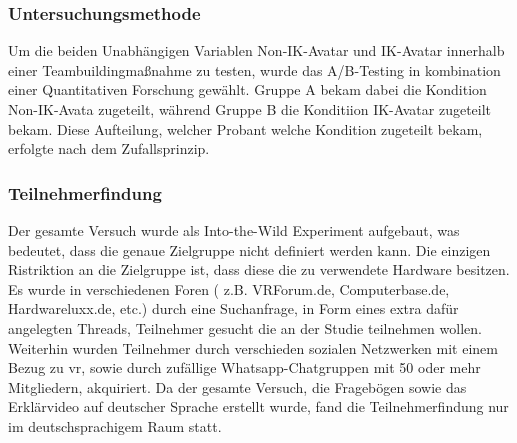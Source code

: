 \documentclass[a4paper,11pt]{article}%
\renewcommand{\\}{\vspace*{0.5\baselineskip} \newline}
\begin{document}
\subsubsection{Untersuchungsmethode}
Um die beiden Unabhängigen Variablen \dq{}Non-IK-Avatar\dq{} und \dq{}IK-Avatar\dq{} innerhalb einer Teambuildingmaßnahme zu testen, wurde das A/B-Testing in kombination einer Quantitativen Forschung gewählt.
Gruppe A bekam dabei die Kondition \dq{}Non-IK-Avata\dq{} zugeteilt, während Gruppe B die Konditiion \dq{}IK-Avatar\dq{} zugeteilt bekam. Diese Aufteilung, welcher Probant welche Kondition zugeteilt bekam, erfolgte nach dem Zufallsprinzip. 

	\subsubsection{Teilnehmerfindung}
Der gesamte Versuch wurde als Into-the-Wild Experiment aufgebaut, was bedeutet, dass die genaue Zielgruppe nicht definiert werden kann. Die einzigen Ristriktion an die Zielgruppe ist, dass diese die zu verwendete Hardware besitzen. Es wurde in verschiedenen Foren ( z.B. VRForum.de, Computerbase.de, Hardwareluxx.de, etc.) durch eine Suchanfrage, in Form eines extra dafür angelegten Threads, Teilnehmer gesucht die an der Studie teilnehmen wollen. Weiterhin wurden Teilnehmer durch verschieden sozialen Netzwerken mit einem Bezug zu \ac{vr}, sowie durch zufällige Whatsapp-Chatgruppen mit 50 oder mehr Mitgliedern, akquiriert. Da der gesamte Versuch, die Fragebögen sowie das Erklärvideo auf deutscher Sprache erstellt wurde, fand die Teilnehmerfindung nur im deutschsprachigem Raum statt.
\end{document}
